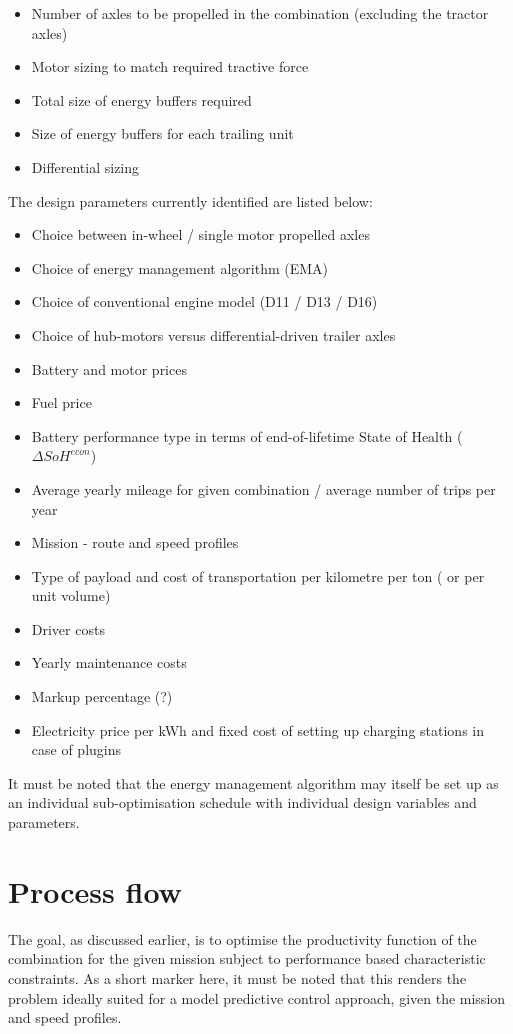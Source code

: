 \documentclass[ExampleMasters.tex]{subfiles}
\begin{document}
		\begin{itemize}
		\item Number of axles to be propelled in the combination (excluding the tractor axles)
		\item Motor sizing to match required tractive force
		\item Total size of energy buffers required
		\item Size of energy buffers for each trailing unit
		\item Differential sizing
		\end{itemize}

		The design parameters currently identified are listed below:

		\begin{itemize}
		\item Choice between in-wheel / single motor propelled axles
		\item Choice of energy management algorithm (EMA)
		\item Choice of conventional engine model (D11 / D13 / D16)
		\item Choice of hub-motors versus differential-driven trailer axles
		\item Battery and motor prices
		\item Fuel price
		\item Battery performance type in terms of end-of-lifetime State of Health ($\Delta SoH^{econ}$)
		\item Average yearly mileage for given combination / average number of trips per year
		\item Mission - route and speed profiles
		\item Type of payload and cost of transportation per kilometre per ton ( or per unit volume)
		\item Driver costs
		\item Yearly maintenance costs
		\item Markup percentage (?)
		\item Electricity price per kWh and fixed cost of setting up charging stations in case of plugins
		\end{itemize}

		It must be noted that the energy management algorithm may itself be set up as an individual sub-optimisation schedule with individual design variables and parameters.

	\section{Process flow}
		The goal, as discussed earlier, is to optimise the productivity function of the combination for the given mission subject to performance based characteristic constraints. As a short marker here, it must be noted that this renders the problem ideally suited for a model predictive control approach, given the mission and speed profiles.
\end{document}
